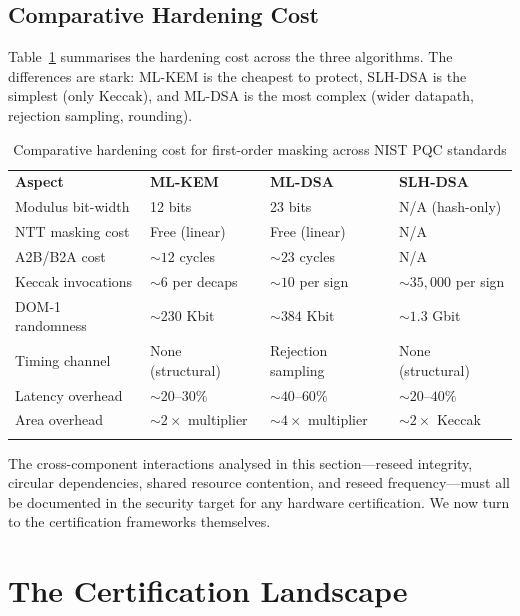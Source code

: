 \subsection{Comparative Hardening Cost}
\label{subsec:comparative-cost}

Table~\ref{tab:comparative-hardening} summarises the hardening cost across the three algorithms.  The differences are stark: ML-KEM is the cheapest to protect, SLH-DSA is the simplest (only Keccak), and ML-DSA is the most complex (wider datapath, rejection sampling, rounding).

\begin{table}[t]
\caption{Comparative hardening cost for first-order masking across NIST PQC standards}
\label{tab:comparative-hardening}
\begin{tabular}{p{3cm}p{3cm}p{3cm}p{3cm}}
\hline\noalign{\smallskip}
\textbf{Aspect} & \textbf{ML-KEM} & \textbf{ML-DSA} & \textbf{SLH-DSA} \\
\noalign{\smallskip}\svhline\noalign{\smallskip}
Modulus bit-width & 12 bits & 23 bits & N/A (hash-only) \\
NTT masking cost & Free (linear) & Free (linear) & N/A \\
A2B/B2A cost & ${\sim}12$ cycles & ${\sim}23$ cycles & N/A \\
Keccak invocations & ${\sim}6$ per decaps & ${\sim}10$ per sign & ${\sim}35{,}000$ per sign \\
DOM-1 randomness & ${\sim}230$ Kbit & ${\sim}384$ Kbit & ${\sim}1.3$ Gbit \\
Timing channel & None (structural) & Rejection sampling & None (structural) \\
Latency overhead & ${\sim}20$--$30\%$ & ${\sim}40$--$60\%$ & ${\sim}20$--$40\%$ \\
Area overhead & ${\sim}2\times$ multiplier & ${\sim}4\times$ multiplier & ${\sim}2\times$ Keccak \\
\noalign{\smallskip}\hline
\end{tabular}
\end{table}

The cross-component interactions analysed in this section---reseed integrity, circular dependencies, shared resource contention, and reseed frequency---must all be documented in the security target for any hardware certification.  We now turn to the certification frameworks themselves.


\section{The Certification Landscape}
\label{sec:certification}

